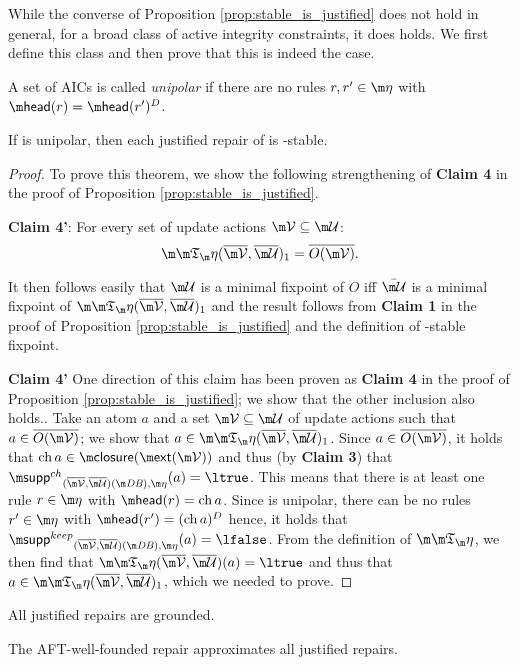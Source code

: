 While the converse of Proposition \ref{prop:stable_is_justified} does not hold in general, for a broad class of active integrity constraints, it does holds. We first define this class and then prove that this is indeed the case. 

\begin{definition}
 A set of AICs \aics is called \emph{unipolar} if there are no rules $r,r'\in\aics$ with $\head(r)=\head(r')^D$. 
\end{definition}




\begin{proposition}\label{prop:justified_is_stable_sometimes}
If \aics is unipolar, then each justified repair of \fulldb is \Ap-stable. 
\end{proposition}
\begin{proof}
 To prove this theorem, we show the following strengthening of \textbf{Claim 4} in the proof of Proposition \ref{prop:stable_is_justified}. 
 \begin{compactdesc}
  \item \textbf{Claim 4'}: For every set of update actions $\VV\subseteq \UU$: 
 \[\Ap(\overline\VV,\overline\UU)_1= \overline{O(\VV)}.\] 
\end{compactdesc}
 It then follows easily that $\UU$ is a minimal fixpoint of $O$ iff $\bar\UU$ is a minimal fixpoint of $\Ap(\overline\VV,\overline\UU)_1$ and the result follows from \textbf{Claim 1} in the proof of Proposition \ref{prop:stable_is_justified} and the definition of \Ap-stable fixpoint. 
 
\textbf{Claim 4'}
One direction of this claim has been proven as \textbf{Claim 4} in the proof of Proposition \ref{prop:stable_is_justified}; we show that the other inclusion also holds.. 
 Take an atom $a$ and a set $\VV\subseteq\UU$ of update actions such that $a\in \overline{O(\VV)}$; we show that $a\in\Ap(\overline\VV,\overline\UU)_1$. Since $a\in\overline{O(\VV)}$, it holds that $\change a\in \closure(\ext(\VV))$ and thus (by \textbf{Claim 3}) that $\suppin_{(\overline\VV,\overline\UU)(\db),\aics}(a)=\ltrue$. This means that there is at least one rule $r\in\aics$ with $\head(r)=\change a$. Since \aics is unipolar, there can be no rules $r'\in\aics$ with $\head(r') = (\change a)^D$ hence, it holds that $\suppout_{(\overline\VV,\overline\UU)(\db),\aics}(a)=\lfalse$. From the definition of $\Ap$, we then find that $\Ap(\overline\VV,\overline\UU)(a)=\ltrue$ and thus that  $a\in \Ap(\overline\VV,\overline\UU)_1$, which we needed to prove. 
\qedhere
\end{proof}

\begin{proposition}
 All justified repairs are grounded.
\end{proposition}

\begin{corollary}
 The AFT-well-founded repair approximates all justified repairs. 
\end{corollary}

